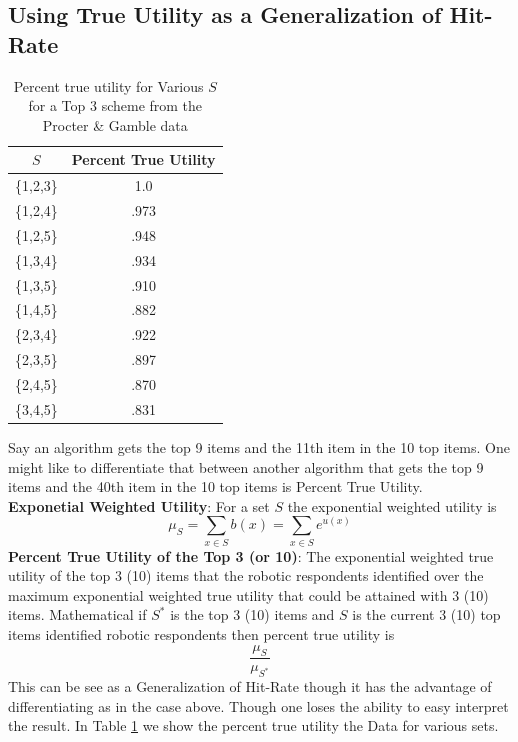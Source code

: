 \documentclass[nonblindrev]{informs3}
\begin{document}
\subsection{Using True Utility as a Generalization of Hit-Rate}
\begin{table}
\begin{center}
\begin{tabular}{c | c }
$S$& Percent True Utility \\
\hline
\{1,2,3\}& 1.0 \\
\{1,2,4\}&.973 \\
\{1,2,5\}&.948 \\
\{1,3,4\}&.934 \\
\{1,3,5\}&.910 \\
\{1,4,5\}&.882 \\
\{2,3,4\}&.922 \\
\{2,3,5\}&.897 \\
\{2,4,5\}&.870 \\
\{3,4,5\}&.831 \\
\hline
\end{tabular}
\end{center}
\caption{Percent true utility for Various $S$ for a Top 3 scheme from the Procter \& Gamble data}
\label{table:PTU}
\end{table}
Say an algorithm gets the top 9 items and the 11th item in the 10 top items. One might like to differentiate that between another algorithm that gets the top 9 items and the 40th item in the 10 top items is Percent True Utility. \\
\textbf{Exponetial Weighted Utility}: For a set $S$ the exponential weighted utility is \[\mu_S=\sum_{x \in S}b(x)=\sum_{x \in S}e^{u(x)}\]
\textbf{Percent True Utility of the Top 3 (or 10)}: The exponential weighted true utility of the top 3 (10) items that the robotic respondents identified over the maximum exponential weighted true utility that could be attained with 3 (10) items. Mathematical if $S^*$ is the top 3 (10) items and $S$ is the current 3 (10) top items identified robotic respondents then percent true utility is 
\[
\frac{\mu_S}{\mu_{S^*}}
\]
This can be see as a Generalization of Hit-Rate though it has the advantage of differentiating as in the case above. Though one loses the ability to easy interpret the result. In Table \ref{table:PTU} we show the percent true utility the Data for various sets.  
\end{document}
